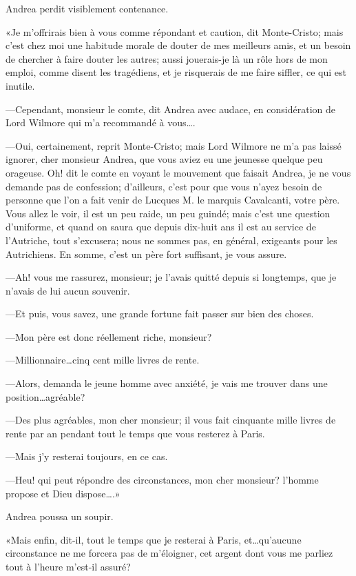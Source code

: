 Andrea perdit visiblement contenance. 

«Je m'offrirais bien à vous comme répondant et caution, dit Monte-Cristo; mais c'est chez moi une habitude morale de douter de mes meilleurs amis, et un besoin de chercher à faire douter les autres; aussi jouerais-je là un rôle hors de mon emploi, comme disent les tragédiens, et je risquerais de me faire siffler, ce qui est inutile. 

—Cependant, monsieur le comte, dit Andrea avec audace, en considération de Lord Wilmore qui m'a recommandé à vous\dots. 

—Oui, certainement, reprit Monte-Cristo; mais Lord Wilmore ne m'a pas laissé ignorer, cher monsieur Andrea, que vous aviez eu une jeunesse quelque peu orageuse. Oh! dit le comte en voyant le mouvement que faisait Andrea, je ne vous demande pas de confession; d'ailleurs, c'est pour que vous n'ayez besoin de personne que l'on a fait venir de Lucques M. le marquis Cavalcanti, votre père. Vous allez le voir, il est un peu raide, un peu guindé; mais c'est une question d'uniforme, et quand on saura que depuis dix-huit ans il est au service de l'Autriche, tout s'excusera; nous ne sommes pas, en général, exigeants pour les Autrichiens. En somme, c'est un père fort suffisant, je vous assure. 

—Ah! vous me rassurez, monsieur; je l'avais quitté depuis si longtemps, que je n'avais de lui aucun souvenir. 

—Et puis, vous savez, une grande fortune fait passer sur bien des choses. 

—Mon père est donc réellement riche, monsieur? 

—Millionnaire\dots cinq cent mille livres de rente. 

—Alors, demanda le jeune homme avec anxiété, je vais me trouver dans une position\dots agréable? 

—Des plus agréables, mon cher monsieur; il vous fait cinquante mille livres de rente par an pendant tout le temps que vous resterez à Paris. 

—Mais j'y resterai toujours, en ce cas. 

—Heu! qui peut répondre des circonstances, mon cher monsieur? l'homme propose et Dieu dispose\dots.» 

Andrea poussa un soupir. 

«Mais enfin, dit-il, tout le temps que je resterai à Paris, et\dots qu'aucune circonstance ne me forcera pas de m'éloigner, cet argent dont vous me parliez tout à l'heure m'est-il assuré? 

